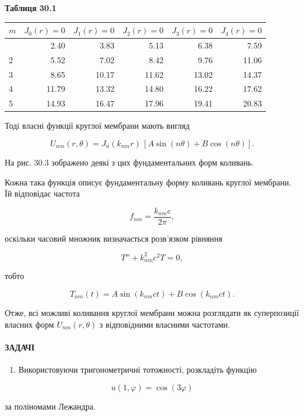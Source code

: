 \documentclass[
  ukrainian,
]{article}
\newcounter{none} %
\providecommand{\tightlist}{%
  \setlength{\itemsep}{0pt}\setlength{\parskip}{0pt}}
\begin{document}
\textbf{Таблиця 30.1}

{\def\LTcaptype{none} %
\begin{longtable}[]{@{}lrrrrr@{}}
\toprule\noalign{}
\(m\) & \(J_0(r)=0\) & \(J_1(r)=0\) & \(J_2(r)=0\) & \(J_3(r)=0\) &
\(J_4(r)=0\) \\
\midrule\noalign{}
\endhead
\bottomrule\noalign{}
\endlastfoot
1 & 2.40 & 3.83 & 5.13 & 6.38 & 7.59 \\
2 & 5.52 & 7.02 & 8.42 & 9.76 & 11.06 \\
3 & 8.65 & 10.17 & 11.62 & 13.02 & 14.37 \\
4 & 11.79 & 13.32 & 14.80 & 16.22 & 17.62 \\
5 & 14.93 & 16.47 & 17.96 & 19.41 & 20.83 \\
\end{longtable}
}

Тоді власні функції круглої мембрани мають вигляд

\[U_{nm}(r,\theta)=J_n(k_{nm}r)\,[A\sin(n\theta)+B\cos(n\theta)].\]

На рис. 30.3 зображено деякі з цих фундаментальних форм коливань.

Кожна така функція описує фундаментальну форму коливань круглої
мембрани. Їй відповідає частота

\[f_{nm}=\frac{k_{nm}c}{2\pi},\]

оскільки часовий множник визначається розв'язком рівняння

\[T'' + k_{nm}^{2}c^{2}T = 0,\]

тобто

\[T_{nm}(t)=A\sin(k_{nm}ct)+B\cos(k_{nm}ct).\]

Отже, всі можливі коливання круглої мембрани можна розглядати як
суперпозиції власних форм \(U_{nm}(r,\theta)\) з відповідними власними
частотами.

\paragraph{ЗАДАЧІ}\label{ux437ux430ux434ux430ux447ux456-1}

\begin{enumerate}
\def\labelenumi{\arabic{enumi}.}
\tightlist
\item
  Використовуючи тригонометричні тотожності, розкладіть функцію
\end{enumerate}

\[u(1,\varphi)=\cos(3\varphi)\]

за поліномами Лежандра.
\end{document}
